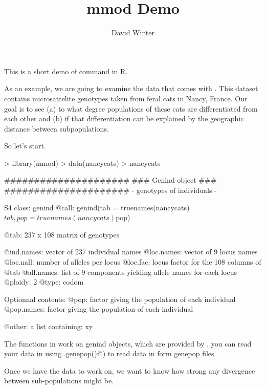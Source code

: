 \documentclass{article}
\begin{document}
\title{mmod Demo}
\author{David Winter}
\maketitle

This is a short demo of \verb@mmod@ command in R. 

As an example, we are going to examine the \verb@nancycats@ data that comes
with \verb@adegenet@. This dataset contains microsattelite genotypes
taken from feral cats in Nancy, France. Our goal is to see (a) to what degree
populations of these cats are differentiated from each other and (b) if that
differentiation can be explained by the geographic distance between subpopulations. 

So let's start. 

\begin{Schunk}
\begin{Sinput}
> library(mmod)
> data(nancycats)
> nancycats
\end{Sinput}
\begin{Soutput}
   #####################
   ### Genind object ### 
   #####################
- genotypes of individuals - 

S4 class:  genind
@call: genind(tab = truenames(nancycats)$tab, pop = truenames(nancycats)$pop)

@tab:  237 x 108 matrix of genotypes

@ind.names: vector of  237 individual names
@loc.names: vector of  9 locus names
@loc.nall: number of alleles per locus
@loc.fac: locus factor for the  108 columns of @tab
@all.names: list of  9 components yielding allele names for each locus
@ploidy:  2
@type:  codom

Optionnal contents: 
@pop:  factor giving the population of each individual
@pop.names:  factor giving the population of each individual

@other: a list containing: xy 
\end{Soutput}
\end{Schunk}

The functions in \verb@mmod@ work on genind objects, which are provided by
 \verb@adegenet@, you can read your data in using \verb@read.genepop()@) to 
 read data in form genepop files. 
 
Once we have the data to work on, we want to know how strong any divergence 
between sub-populations might be. 
\end{document}
